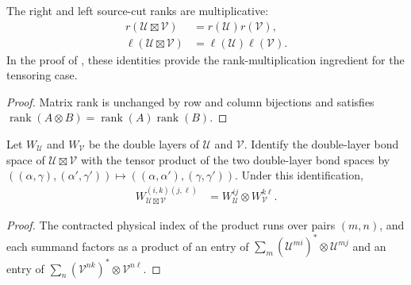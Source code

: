 \begin{lemma}
    \label{thm:mpu_tensor_product_source_ranks}
    \leanok
    The right and left source-cut ranks are multiplicative:
    \begin{align}
        r(\mathcal U\boxtimes\mathcal V)
         & =r(\mathcal U)r(\mathcal V),       \\
        \ell(\mathcal U\boxtimes\mathcal V)
         & =\ell(\mathcal U)\ell(\mathcal V).
    \end{align}
    In the proof of \cite[Theorem~IV.6(ii)]{Cirac2017MPU}, these identities provide the rank-multiplication ingredient for the tensoring
    case.
\end{lemma}

\begin{proof}\leanok
    Matrix rank is unchanged by row and column bijections and satisfies
    $\operatorname{rank}(A\otimes B)=\operatorname{rank}(A)
        \operatorname{rank}(B)$.
\end{proof}

\begin{lemma}
    \label{lem:mpu_double_layer_tensor_product}
    \leanok
    Let $W_{\mathcal U}$ and $W_{\mathcal V}$ be the double layers of
    $\mathcal U$ and $\mathcal V$. Identify the double-layer bond space of
    $\mathcal U\boxtimes\mathcal V$ with the tensor product of the two
    double-layer bond spaces by
    $((\alpha,\gamma),(\alpha',\gamma'))\mapsto((\alpha,\alpha'),(\gamma,\gamma'))$.
    Under this identification,
    \begin{align}
        W_{\mathcal U\boxtimes\mathcal V}^{(i,k)(j,\ell)}
         & =W_{\mathcal U}^{ij}\otimes W_{\mathcal V}^{k\ell}.
    \end{align}
\end{lemma}

\begin{proof}\leanok
    The contracted physical index of the product runs over pairs $(m,n)$, and
    each summand factors as a product of an entry of
    $\sum_m(\mathcal U^{mi})^{*}\otimes\mathcal U^{mj}$ and an entry of
    $\sum_n(\mathcal V^{nk})^{*}\otimes\mathcal V^{n\ell}$.
\end{proof}

